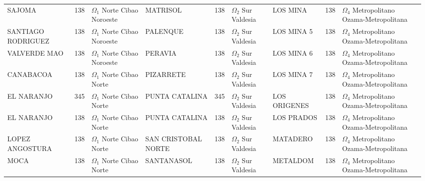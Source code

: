 \begin{table}[!p]
{{\begin{tabular}{@{}lrl@{\hspace{3.5pt}}|@{\hspace{3.5pt}}lrl@{\hspace{3.5pt}}|@{\hspace{3.5pt}}lrl@{}}
SAJOMA & 138 & \makecell[l]{$\Omega_1$ Norte\\Cibao Noroeste} & MATRISOL & 138 & \makecell[l]{$\Omega_2$ Sur\\Valdesia} & LOS MINA & 138 & \makecell[l]{$\Omega_4$ Metropolitano\\Ozama-Metropolitana} \\
SANTIAGO RODRIGUEZ & 138 & \makecell[l]{$\Omega_1$ Norte\\Cibao Noroeste} & PALENQUE & 138 & \makecell[l]{$\Omega_2$ Sur\\Valdesia} & LOS MINA 5 & 138 & \makecell[l]{$\Omega_4$ Metropolitano\\Ozama-Metropolitana} \\
VALVERDE MAO & 138 & \makecell[l]{$\Omega_1$ Norte\\Cibao Noroeste} & PERAVIA & 138 & \makecell[l]{$\Omega_2$ Sur\\Valdesia} & LOS MINA 6 & 138 & \makecell[l]{$\Omega_4$ Metropolitano\\Ozama-Metropolitana} \\
CANABACOA & 138 & \makecell[l]{$\Omega_1$ Norte\\Cibao Norte} & PIZARRETE & 138 & \makecell[l]{$\Omega_2$ Sur\\Valdesia} & LOS MINA 7 & 138 & \makecell[l]{$\Omega_4$ Metropolitano\\Ozama-Metropolitana} \\
EL NARANJO & 345 & \makecell[l]{$\Omega_1$ Norte\\Cibao Norte} & PUNTA CATALINA & 345 & \makecell[l]{$\Omega_2$ Sur\\Valdesia} & LOS ORIGENES & 138 & \makecell[l]{$\Omega_4$ Metropolitano\\Ozama-Metropolitana} \\
EL NARANJO & 138 & \makecell[l]{$\Omega_1$ Norte\\Cibao Norte} & PUNTA CATALINA & 138 & \makecell[l]{$\Omega_2$ Sur\\Valdesia} & LOS PRADOS & 138 & \makecell[l]{$\Omega_4$ Metropolitano\\Ozama-Metropolitana} \\
LOPEZ ANGOSTURA & 138 & \makecell[l]{$\Omega_1$ Norte\\Cibao Norte} & SAN CRISTOBAL NORTE & 138 & \makecell[l]{$\Omega_2$ Sur\\Valdesia} & MATADERO & 138 & \makecell[l]{$\Omega_4$ Metropolitano\\Ozama-Metropolitana} \\
MOCA & 138 & \makecell[l]{$\Omega_1$ Norte\\Cibao Norte} & SANTANASOL & 138 & \makecell[l]{$\Omega_2$ Sur\\Valdesia} & METALDOM & 138 & \makecell[l]{$\Omega_4$ Metropolitano\\Ozama-Metropolitana} \\

\end{tabular}}}
\end{table}
